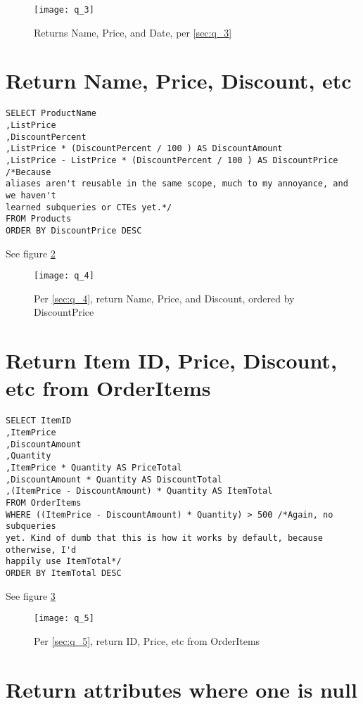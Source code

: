 \documentclass{article}
\begin{document}
\begin{figure}[H]\centering
	\caption{Returns Name, Price, and Date, per \ref{sec:q_3}}
	\texttt{[image: q\_3]}
	\label{fig:q_3}
\end{figure}

\section{Return Name, Price, Discount, etc}

\begin{lstlisting}[float]
SELECT ProductName
,ListPrice
,DiscountPercent
,ListPrice * (DiscountPercent / 100 ) AS DiscountAmount
,ListPrice - ListPrice * (DiscountPercent / 100 ) AS DiscountPrice /*Because
aliases aren't reusable in the same scope, much to my annoyance, and we haven't
learned subqueries or CTEs yet.*/
FROM Products
ORDER BY DiscountPrice DESC
\end{lstlisting}\label{sec:q_4}
See figure \ref{fig:q_4}

\begin{figure}[H]\centering
	\caption{Per \ref{sec:q_4}, return Name, Price, and Discount, ordered
	by DiscountPrice}
	\texttt{[image: q\_4]}
	\label{fig:q_4}
\end{figure}

\section{Return Item ID, Price, Discount, etc from OrderItems}

\begin{lstlisting}[float]
SELECT ItemID
,ItemPrice
,DiscountAmount
,Quantity
,ItemPrice * Quantity AS PriceTotal
,DiscountAmount * Quantity AS DiscountTotal
,(ItemPrice - DiscountAmount) * Quantity AS ItemTotal
FROM OrderItems
WHERE ((ItemPrice - DiscountAmount) * Quantity) > 500 /*Again, no subqueries
yet. Kind of dumb that this is how it works by default, because otherwise, I'd
happily use ItemTotal*/
ORDER BY ItemTotal DESC
\end{lstlisting}\label{sec:q_5}
See figure \ref{fig:q_5}

\begin{figure}[H]\centering
	\caption{Per \ref{sec:q_5}, return ID, Price, etc from OrderItems}
	\texttt{[image: q\_5]}
	\label{fig:q_5}
\end{figure}

\section{Return attributes where one is null}
\end{document}
